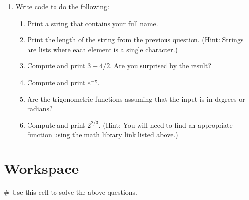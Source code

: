 \documentclass{ximera}
\begin{document}
\begin{enumerate}
\begin{enumerate}
    \end{enumerate}
\item Write code to do the following:
    \begin{enumerate}
    \item Print a string that contains your full name.
    \item Print the length of the string from the previous question. (Hint: Strings are lists where each element is a single character.)
    \item Compute and print $3+4/2$. Are you surprised by the result?
    \item Compute and print $e^{-\pi}$.
    \item Are the trigonometric functions assuming that the input is in degrees or radians?
    \item Compute and print $2^{2/3}$. (Hint: You will need to find an appropriate function using the math library link listed above.)
    \end{enumerate}
\end{enumerate}


\section{Workspace}

\begin{sageCell}
# Use this cell to solve the above questions.
\end{sageCell}
\end{document}
